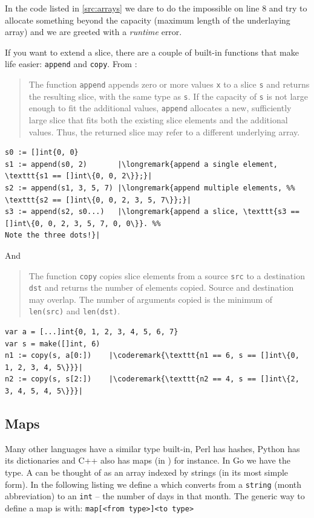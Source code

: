 In the code listed in \ref{src:arrays} we dare to do the impossible on
line 8 and try to allocate something
beyond the capacity (maximum length of the underlaying array) and
we are greeted with a \emph{runtime} error.

If you want to extend a slice, there are a couple of built-in functions
that make life easier:
\lstinline{append} and \lstinline{copy}. From \cite{go_spec}:
\begin{quote}
The function \lstinline{append} appends zero or more values \lstinline{x} to a
slice \lstinline{s} and returns the resulting slice, with the same type as
\lstinline{s}.
If the capacity of \lstinline{s} is not large enough to fit the additional values,
\lstinline{append} allocates a new, sufficiently large slice that fits both the
existing slice elements and the additional values. Thus, the returned
slice may refer to a different underlying array.
\end{quote}
\begin{lstlisting}
s0 := []int{0, 0}
s1 := append(s0, 2)       |\longremark{append a single element, \texttt{s1 == []int\{0, 0, 2\}};}|
s2 := append(s1, 3, 5, 7) |\longremark{append multiple elements, %% 
\texttt{s2 == []int\{0, 0, 2, 3, 5, 7\}};}|
s3 := append(s2, s0...)   |\longremark{append a slice, \texttt{s3 == []int\{0, 0, 2, 3, 5, 7, 0, 0\}}. %%
Note the three dots!}|
\end{lstlisting}
\showremarks
And
\begin{quote}
The function \lstinline{copy} copies slice elements from a source
\lstinline{src} to a
destination \lstinline{dst} and returns the number of elements copied. Source and
destination may overlap. The number of arguments
copied is the minimum of \lstinline{len(src)} and
\mbox{\lstinline{len(dst)}}.
\end{quote}
\begin{lstlisting}
var a = [...]int{0, 1, 2, 3, 4, 5, 6, 7}
var s = make([]int, 6)
n1 := copy(s, a[0:])    |\coderemark{\texttt{n1 == 6, s == []int\{0, 1, 2, 3, 4, 5\}}}|
n2 := copy(s, s[2:])    |\coderemark{\texttt{n2 == 4, s == []int\{2, 3, 4, 5, 4, 5\}}}|
\end{lstlisting}

\subsection{Maps}
\label{sec:maps}
Many other languages have a similar type built-in, Perl has hashes,
Python has its dictionaries and C++ also has maps (in
) for instance. 
In Go we have the
 type. A  can be thought of as an array indexed by
strings (in its most simple form).
In the following listing we define a  which converts from a
\lstinline{string} (month abbreviation) to an \lstinline{int} -- the number of days in that month. 
The generic way to define a map is with: \verb|map[<from type>]<to type>|

